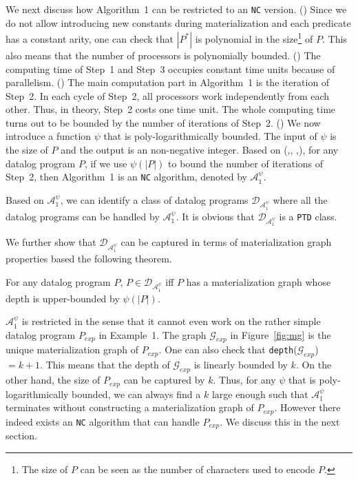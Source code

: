 \documentclass{article}
\begin{document}
We next discuss how Algorithm~1 can be restricted to an \texttt{NC} version. (\uppercase\expandafter{}) Since we do not allow introducing new constants during materialization and each predicate has a constant arity, one can check that $|P^*|$ is polynomial in the size\footnote{The size of $P$ can be seen as the number of characters used to encode $P$.} of $P$. This also means that the number of processors is polynomially bounded. (\uppercase\expandafter{}) The computing time of Step~1 and Step~3 occupies constant time units because of parallelism. (\uppercase\expandafter{}) The main computation part in Algorithm~1 is the iteration of Step~2. In each cycle of Step~2, all processors work independently from each other. Thus, in theory, Step~2 costs one time unit. The whole computing time turns out to be bounded by the number of iterations of Step~2. (\uppercase\expandafter{})
We now introduce a function $\psi$ that is poly-logarithmically bounded.  The input of $\psi$ is the size of $P$ and the output is an non-negative integer. Based on (\uppercase\expandafter{},\uppercase\expandafter{},
\uppercase\expandafter{},\uppercase\expandafter{}), for any datalog program $P$, if we use $\psi(|P|)$ to
bound the number of iterations of Step~2, then Algorithm~1 is an \texttt{NC} algorithm, denoted by $\mathcal{A}_1^{\psi}$.

Based on $\mathcal{A}_1^{\psi}$, we can identify a class of datalog programs $\mathcal{D}_{\mathcal{A}_1^{\psi}}$ where all the datalog programs can be handled by $\mathcal{A}_1^{\psi}$. It is obvious that $\mathcal{D}_{\mathcal{A}_1^{\psi}}$ is a \texttt{PTD} class.

We further show that $\mathcal{D}_{\mathcal{A}_1^{\psi}}$ can be captured in terms of materialization graph properties based the following theorem.

\begin{theorem}
For any datalog program $P$, $P\in\mathcal{D}_{\mathcal{A}_1^{\psi}}$ iff $P$ has a materialization graph whose depth is upper-bounded by $\psi(|P|)$.
\end{theorem}

$\mathcal{A}_1^{\psi}$ is restricted in the sense that it cannot even work on the rather simple datalog program $P_{exp}$ in Example~1. The graph $\mathcal{G}_{exp}$ in Figure~\ref{fig:mg} is the unique materialization graph of $P_{exp}$. One can also check that \texttt{depth}($\mathcal{G}_{exp}$)$=k+1$. This means that the depth of $\mathcal{G}_{exp}$ is linearly bounded by $k$. On the other hand, the size of $P_{exp}$ can be captured by $k$. Thus, for any $\psi$ that is poly-logarithmically bounded, we can always find a $k$  large enough such that $\mathcal{A}_1^{\psi}$ terminates without constructing a materialization graph of $P_{exp}$. However there indeed exists an \texttt{NC} algorithm that can handle $P_{exp}$. We discuss this in the next section.
\end{document}
